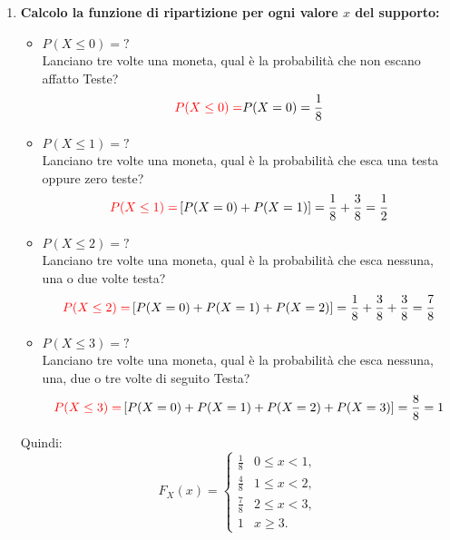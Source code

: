 \documentclass{article}  %
\theoremstyle{definition}
\begin{document}
\begin{esercizio}[Esercizio]
\begin{enumerate}
		\item \textbf{Calcolo la funzione di ripartizione per ogni valore $x$ del supporto:}
		      \begin{itemize}
			      \item $P(X \leq 0)=?$ \\
			            Lanciano tre volte una moneta, qual è la probabilità che non escano affatto Teste?
			            \[
				            \textcolor{red}{P(X \leq 0)=}P(X=0)=\frac{1}{8}
			            \]
			      \item $P(X \leq 1)=?$ \\
			            Lanciano tre volte una moneta, qual è la probabilità che esca una testa oppure zero teste?
			            \[
				            \textcolor{red}{P(X \leq 1)=}\left[P(X=0)+P(X=1)\right]=\frac{1}{8}+\frac{3}{8}=\frac{1}{2}
			            \]
			      \item $P(X \leq 2)=?$ \\
			            Lanciano tre volte una moneta, qual è la probabilità che esca nessuna, una o due volte testa?
			            \[
				            \textcolor{red}{P(X \leq 2)=}\left[P(X=0)+P(X=1)+P(X=2)\right]=\frac{1}{8}+\frac{3}{8}+\frac{3}{8}=\frac{7}{8}
			            \]
			      \item $P(X \leq 3)=?$ \\
			            Lanciano tre volte una moneta, qual è la probabilità che esca nessuna, una, due o tre volte di seguito Testa?
			            \[
				            \textcolor{red}{P(X \leq 3)=}\left[P(X=0)+P(X=1)+P(X=2)+P(X=3)\right]=\frac{8}{8}=1
			            \]
		      \end{itemize}
		      Quindi:
		      \[
			      F_X(x) =
			      \begin{cases}
				      \frac{1}{8} & 0 \le x < 1, \\[2mm]
				      \frac{4}{8} & 1 \le x < 2, \\[2mm]
				      \frac{7}{8} & 2 \le x < 3, \\[2mm]
				      1           & x \ge 3.
			      \end{cases}
		      \]
	\end{enumerate}
\end{esercizio}
\end{document}
